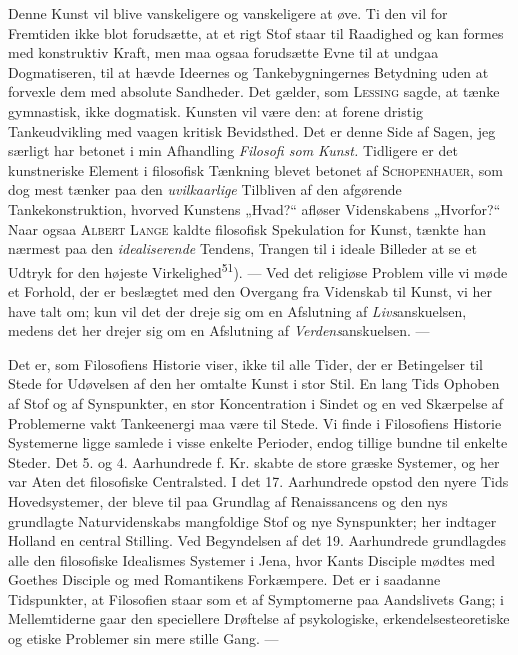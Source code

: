 \documentclass[12pt,a4paper,openany]{book}
\newcommand{\opage}[1]{\marginnote{\footnotesize\textit{[#1]}}}
\begin{document}
Denne Kunst vil blive vanskeligere og vanskeligere at øve. Ti den vil for
Fremtiden ikke blot forudsætte, at et rigt Stof staar til Raadighed og kan
formes med konstruktiv Kraft, men maa ogsaa forudsætte Evne til at undgaa
Dogmatiseren, til at hævde Ideernes og Tankebygningernes Betydning uden at
forvexle dem med absolute Sandheder. Det gælder, som \textsc{Lessing} sagde, at
tænke gymnastisk, ikke dogmatisk. Kunsten vil være den: at forene dristig
Tankeudvikling med vaagen kritisk Bevidsthed. Det er denne Side af Sagen, jeg
særligt har betonet i min Afhandling \textit{Filosofi som Kunst.} Tidligere er
det kunstneriske Element i filosofisk Tænkning blevet betonet af
\textsc{Schopenhauer}, som dog mest tænker paa den \textit{uvilkaarlige}
Tilbliven af den afgørende Tankekonstruktion, hvorved Kunstens „Hvad?“ afløser
Videnskabens „Hvorfor?“ Naar ogsaa \textsc{Albert Lange} kaldte filosofisk
Spekulation for Kunst, tænkte han nærmest paa den \textit{idealiserende}
Tendens, Trangen til i ideale Billeder at se et Udtryk for den højeste
Virkelighed\textsuperscript{51}). --- Ved det religiøse Problem ville vi møde
et Forhold, der er beslægtet med den Overgang fra Videnskab til Kunst, vi her
have talt om; kun vil det der dreje sig om en Afslutning af
\textit{Livs}anskuelsen, medens det her drejer sig om en Afslutning af
\textit{Verdens}anskuelsen. ---

\opage{59}Det er, som Filosofiens Historie viser, ikke til alle Tider, der er
Betingelser til Stede for Udøvelsen af den her omtalte Kunst i stor Stil. En
lang Tids Ophoben af Stof og af Synspunkter, en stor Koncentration i Sindet og
en ved Skærpelse af Problemerne vakt Tankeenergi maa være til Stede. Vi finde i
Filosofiens Historie Systemerne ligge samlede i visse enkelte Perioder, endog
tillige bundne til enkelte Steder. Det 5. og 4. Aarhundrede f. Kr. skabte de
store græske Systemer, og her var Aten det filosofiske Centralsted. I det 17.
Aarhundrede opstod den nyere Tids Hovedsystemer, der bleve til paa Grundlag af
Renaissancens og den nys grundlagte Naturvidenskabs mangfoldige Stof og nye
Synspunkter; her indtager Holland en central Stilling. Ved Begyndelsen af det
19. Aarhundrede grundlagdes alle den filosofiske Idealismes Systemer i Jena,
hvor Kants Disciple mødtes med Goethes Disciple og med Romantikens Forkæmpere.
Det er i saadanne Tidspunkter, at Filosofien staar som et af Symptomerne paa
Aandslivets Gang; i Mellemtiderne gaar den speciellere Drøftelse af
psykologiske, erkendelsesteoretiske og etiske Problemer sin mere stille Gang. ---
\end{document}
